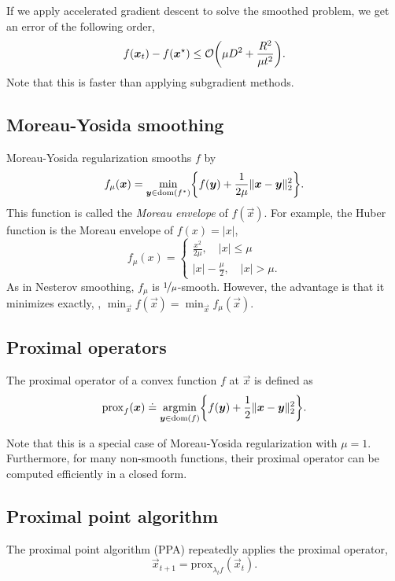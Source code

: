 If we apply accelerated gradient descent to solve the smoothed problem, we get an error of the
following order, \[
    f(\vec{x}_t) - f(\vec{x}^\star) \leq \bigo{\mu D^2 + \frac{R^2}{\mu t^2}}.
\]
Note that this is faster than applying subgradient methods.

\subsection{Moreau-Yosida smoothing}

Moreau-Yosida regularization smooths $f$ by \[
    f_{\mu}(\vec{x}) = \min_{\vec{y} \in \dom{f^*}} \lft\{ f(\vec{y}) + \frac{1}{2\mu} \| \vec{x} - \vec{y} \|_2^2 \rgt\}.
\]
This function is called the \textit{Moreau envelope} of $f(\vec{x})$. For example, the Huber
function is the Moreau envelope of $f(x) = |x|$, \[
    f_{\mu}(x) = \begin{cases}
        \frac{x^2}{2 \mu}, \quad |x| \leq \mu \\
        |x| - \frac{\mu}{2}, \quad |x| > \mu.
    \end{cases}
\]
As in Nesterov smoothing, $f_{\mu}$ is $\nicefrac{1}{\mu}$-smooth. However, the advantage is that
it minimizes exactly, \ie, $\min_{\vec{x}} f(\vec{x}) = \min_{\vec{x}} f_{\mu}(\vec{x})$.

\subsection{Proximal operators}

\begin{definition}
    The proximal operator of a convex function $f$ at $\vec{x}$ is defined as \[
        \mathrm{prox}_f(\vec{x}) \doteq \argmin_{\vec{y} \in \dom{f}} \lft\{ f(\vec{y}) + \frac{1}{2} \| \vec{x} - \vec{y} \|_2^2 \rgt\}.
    \]
\end{definition}
Note that this is a special case of Moreau-Yosida regularization with $\mu = 1$. Furthermore, for
many non-smooth functions, their proximal operator can be computed efficiently in a closed form.

\subsection{Proximal point algorithm}

The proximal point algorithm (PPA) repeatedly applies the proximal operator, \[
    \vec{x}_{t+1} = \mathrm{prox}_{\lambda_t f}(\vec{x}_t).
\]

